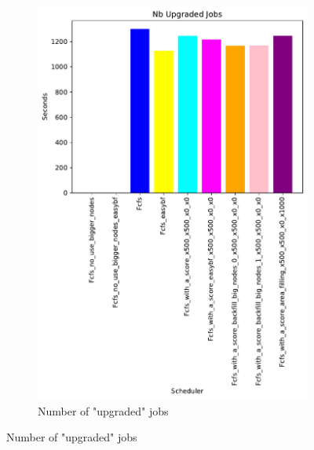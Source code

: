 \documentclass[a4paper]{article}
\begin{document}
\begin{figure}[H]\centering
\begin{subfigure}[b]{0.4\linewidth}\centering\includegraphics[width=1\linewidth]{MBSS/plot/Results_Size_And_Data_2022-01-24->2022-01-24_Nb_Upgraded_Jobs_162_128_162_256_162_1024.pdf}\caption{Number of "upgraded" jobs}\label{22}\end{subfigure}

\end{figure}
\end{document}
